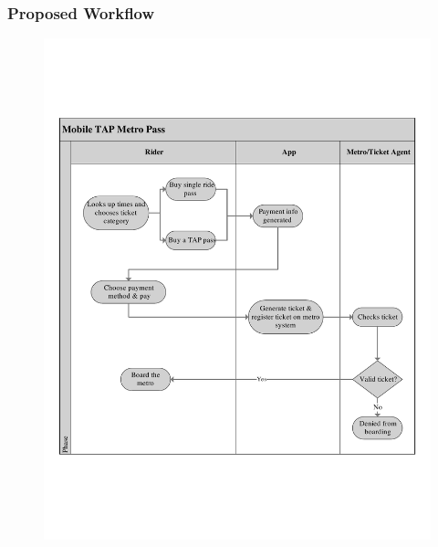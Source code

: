 	\subsubsection{Proposed Workflow}
		\begin{figure}[h]
			\centering
			\includegraphics[scale=.355]{OCD/uml.pdf}
		\end{figure}